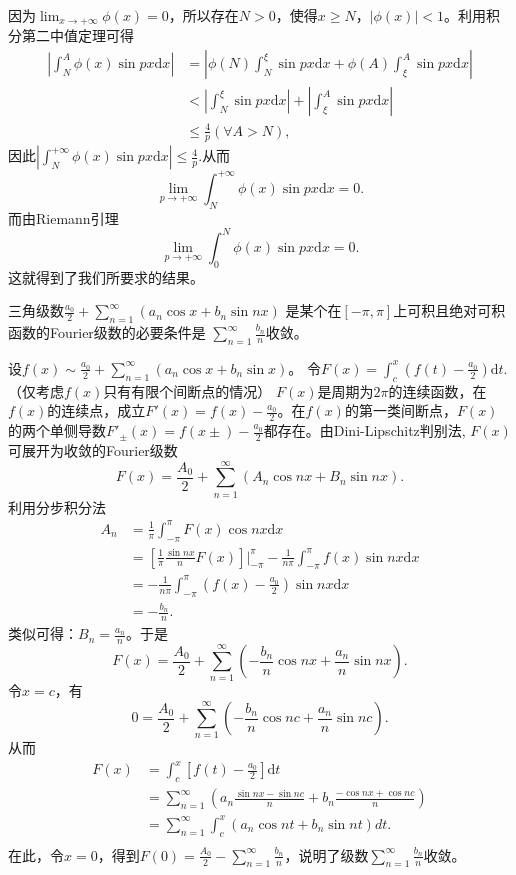 \begin{solution}
 因为$\lim_{x\rightarrow+\infty}\phi(x)=0$，所以存在$N>0$，使得$x\geq N$，$|\phi(x)|<1$。利用积分第二中值定理可得
\begin{align*}
|\int_N^A\phi(x)\sin px\mathrm{d}x|&=|\phi(N)\int_N^{\xi}\sin px\mathrm{d}x+\phi(A)\int_{\xi}^A\sin px\mathrm{d}x|\\
&<|\int_N^{\xi}\sin px\mathrm{d}x|+|\int_{\xi}^A\sin px\mathrm{d}x|\\
&\leq\frac{4}{p}(\forall A>N),
\end{align*}
因此$|\int_N^{+\infty}\phi(x)\sin px\mathrm{d}x|\leq\frac{4}{p}.$从而
$$\lim_{p\rightarrow+\infty}\int_N^{+\infty}\phi(x)\sin px\mathrm{d}x=0.$$
而由Riemann引理
$$\lim_{p\rightarrow+\infty}\int_0^N\phi(x)\sin px\mathrm{d}x=0.$$
这就得到了我们所要求的结果。 
\end{solution}

\begin{exercise}
 三角级数$\frac{a_0}2+\sum_{n=1}^{\infty}(a_n\cos x+b_n\sin nx)$
 是某个在$[-\pi,\pi]$上可积且绝对可积函数的Fourier级数的必要条件是
 $\sum_{n=1}^{\infty}\frac{b_n}n$收敛。  
\end{exercise}

\begin{solution}
  设$f(x)\sim\frac{a_0}{2}+\sum_{n=1}^{\infty}(a_n\cos x+b_n\sin x)$。
  令$F(x)=\int_c^x(f(t)-\frac{a_0}{2})\mathrm{d}t.$（仅考虑$f(x)$只有有限个间断点的情况）
  $F(x)$是周期为$2\pi$的连续函数，在$f(x)$的连续点，成立$F'(x)=f(x)-\frac{a_0}{2}$。在$f(x)$的第一类间断点，$F(x)$的两个单侧导数$F'_{\pm}(x)=f(x\pm)-\frac{a_0}{2}$都存在。由Dini-Lipschitz判别法, $F(x)$可展开为收敛的Fourier级数$$F(x)=\frac{A_0}{2}+\sum_{n=1}^{\infty}(A_n\cos nx+B_n\sin nx).$$
  利用分步积分法
  \begin{align*}
  A_n&=\frac{1}{\pi}\int_{-\pi}^{\pi}F(x)\cos nx\mathrm{d}x\\
  &=[\frac{1}{\pi}\frac{\sin nx}{n}F(x)]|_{-\pi}^{\pi}-\frac{1}{n\pi}\int_{-\pi}^{\pi}f(x)\sin nx\mathrm{d}x\\
  &=-\frac{1}{n\pi}\int_{-\pi}^{\pi}(f(x)-\frac{a_0}{2})\sin nx\mathrm{d}x\\
  &=-\frac{b_n}{n}.
  \end{align*}
  类似可得：$B_n=\frac{a_n}{n}$。于是$$F(x)=\frac{A_0}{2}+\sum_{n=1}^{\infty}(-\frac{b_n}{n}\cos nx+\frac{a_n}{n}\sin nx).$$
  令$x=c$，有
  $$0=\frac{A_0}{2}+\sum_{n=1}^{\infty}(-\frac{b_n}{n}\cos nc+\frac{a_n}{n}\sin nc).$$
  从而
  \begin{align*}
  F(x)&=\int_c^x[f(t)-\frac{a_0}{2}]\mathrm{d}t\\
  &=\sum_{n=1}^{\infty}(a_n\frac{\sin nx-\sin nc}{n}+b_n\frac{-\cos nx+\cos nc}{n})\\
  &=\sum_{n=1}^{\infty}\int_c^x(a_n\cos nt+b_n\sin nt)dt.\\
  \end{align*}
  在此，令$x=0$，得到$F(0)=\frac{A_0}{2}-\sum_{n=1}^{\infty}\frac{b_n}{n}$，说明了级数$\sum_{n=1}^{\infty}\frac{b_n}{n}$收敛。  
\end{solution}

